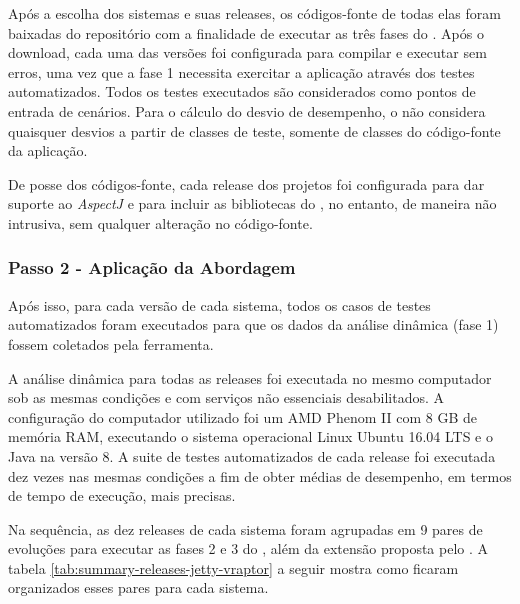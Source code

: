 Após a escolha dos sistemas e suas releases, os códigos-fonte de todas elas foram baixadas do repositório com a finalidade de executar as três fases do \textit{\perfMinerName}. Após o download, cada uma das versões foi configurada para compilar e executar sem erros, uma vez que a fase 1 necessita exercitar a aplicação através dos testes automatizados. Todos os testes executados são considerados como pontos de entrada de cenários. Para o cálculo do desvio de desempenho, o \textit{\perfMinerName} não considera quaisquer desvios a partir de classes de teste, somente de classes do código-fonte da aplicação.

De posse dos códigos-fonte, cada release dos projetos foi configurada para dar suporte ao \textit{AspectJ} e para incluir as bibliotecas do \textit{\perfMinerName}, no entanto, de maneira não intrusiva, sem qualquer alteração no código-fonte.

\subsubsection{Passo 2 - Aplicação da Abordagem} \label{subsec:avaliacao-procedimentos-passo-2}

Após isso, para cada versão de cada sistema, todos os casos de testes automatizados foram executados para que os dados da análise dinâmica (fase 1) fossem coletados pela ferramenta.

A análise dinâmica para todas as releases foi executada no mesmo computador sob as mesmas condições e com serviços não essenciais desabilitados. A configuração do computador utilizado foi um AMD Phenom II com 8 GB de memória RAM, executando o sistema operacional Linux Ubuntu 16.04 LTS e o Java na versão 8. A suite de testes automatizados de cada release foi executada dez vezes nas mesmas condições a fim de obter médias de desempenho, em termos de tempo de execução, mais precisas.

Na sequência, as dez releases de cada sistema foram agrupadas em 9 pares de evoluções para executar as fases 2 e 3 do \textit{\perfMinerName}, além da extensão proposta pelo \textit{\toolName}. A tabela \ref{tab:summary-releases-jetty-vraptor} a seguir mostra como ficaram organizados esses pares para cada sistema.

